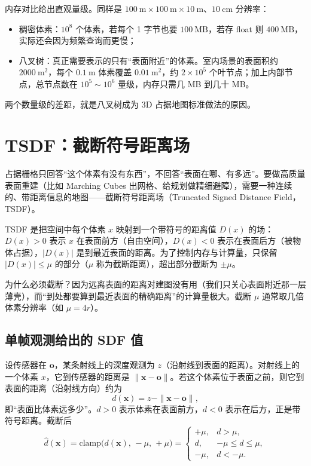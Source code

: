 内存对比给出直观量级。同样是 $100\ \mathrm{m}\times100\ \mathrm{m}\times10\ \mathrm{m}$、$10\ \mathrm{cm}$ 分辨率：
\begin{itemize}
  \item 稠密体素：$10^{8}$ 个体素，若每个 1 字节也要 $100\ \mathrm{MB}$，若存 float 则 $400\ \mathrm{MB}$，实际还会因为频繁查询而更慢；
  \item 八叉树：真正需要表示的只有``表面附近''的体素。室内场景的表面积约 $2000\ \mathrm{m}^{2}$，每个 $0.1\ \mathrm{m}$ 体素覆盖 $0.01\ \mathrm{m}^{2}$，约 $2\times10^{5}$ 个叶节点；加上内部节点，总节点数在 $10^{5}\sim10^{6}$ 量级，内存只需几 MB 到几十 MB\cite{hornung2013octomap}。
\end{itemize}
两个数量级的差距，就是八叉树成为 3D 占据地图标准做法的原因。

\section{TSDF：截断符号距离场}\label{sec:14-tsdf}

占据栅格只回答``这个体素有没有东西''，不回答``表面在哪、有多远''。要做高质量表面重建（比如 Marching Cubes 出网格、给规划做精细避障），需要一种连续的、带距离信息的地图——截断符号距离场（Truncated Signed Distance Field，TSDF）。

\begin{definition}[TSDF]
TSDF 是把空间中每个体素 $x$ 映射到一个带符号的距离值 $D(x)$ 的场：$D(x)>0$ 表示 $x$ 在表面前方（自由空间），$D(x)<0$ 表示在表面后方（被物体占据），$|D(x)|$ 是到最近表面的距离。为了控制内存与计算量，只保留 $|D(x)|\le\mu$ 的部分（$\mu$ 称为截断距离），超出部分截断为 $\pm\mu$。
\end{definition}

为什么必须截断？因为远离表面的距离对建图没有用（我们只关心表面附近那一层薄壳），而``到处都要算到最近表面的精确距离''的计算量极大。截断 $\mu$ 通常取几倍体素分辨率（如 $\mu=4r$）。

\subsection{单帧观测给出的 SDF 值}

设传感器在 $\bm{o}$，某条射线上的深度观测为 $z$（沿射线到表面的距离）。对射线上的一个体素 $x$，它到传感器的距离是 $\|\bm{x}-\bm{o}\|$。若这个体素位于表面之前，则它到表面的距离（沿射线方向）约为
\begin{equation}
d(\bm{x})=z-\|\bm{x}-\bm{o}\| ,
\end{equation}
即``表面比体素远多少''。$d>0$ 表示体素在表面前方，$d<0$ 表示在后方，正是带符号距离。截断后
\begin{equation}
\hat d(\bm{x})=\mathrm{clamp}\big(d(\bm{x}),\,-\mu,\,+\mu\big)
=\begin{cases}
+\mu, & d>\mu,\\
d, & -\mu\le d\le\mu,\\
-\mu, & d<-\mu .
\end{cases}
\label{eq:14-tsdf-clamp}
\end{equation}

